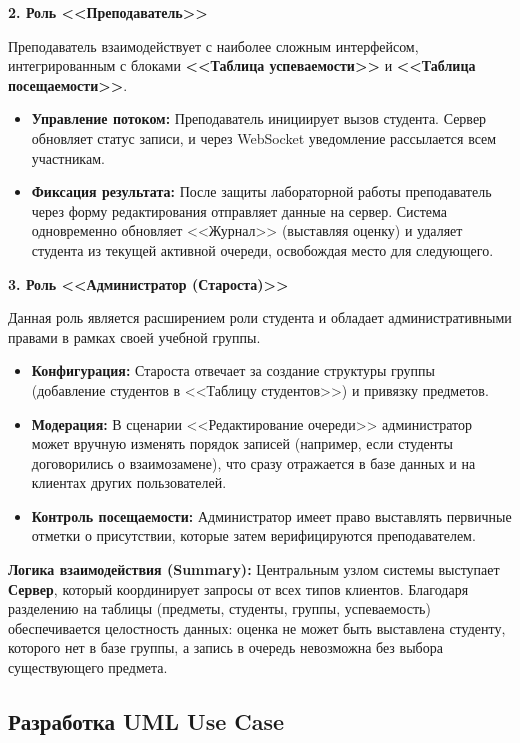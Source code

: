 \textbf{2. Роль <<Преподаватель>>}

Преподаватель взаимодействует с наиболее сложным интерфейсом, интегрированным с блоками 
\textbf{<<Таблица успеваемости>>} и \textbf{<<Таблица посещаемости>>}.

\begin{itemize}
    \item \textbf{Управление потоком:} Преподаватель инициирует вызов студента. Сервер 
	обновляет статус записи, и через WebSocket уведомление рассылается всем участникам.
    \item \textbf{Фиксация результата:} После защиты лабораторной работы преподаватель через форму 
	редактирования отправляет данные на сервер. Система одновременно обновляет <<Журнал>> (выставляя оценку) 
	и удаляет студента из текущей активной очереди, освобождая место для следующего.
\end{itemize}

\textbf{3. Роль <<Администратор (Староста)>>}

Данная роль является расширением роли студента и обладает административными правами в рамках своей учебной группы.

\begin{itemize}
    \item \textbf{Конфигурация:} Староста отвечает за создание структуры группы (добавление студентов в 
	<<Таблицу студентов>>) и привязку предметов.
    \item \textbf{Модерация:} В сценарии <<Редактирование очереди>> администратор может вручную изменять 
	порядок записей (например, если студенты договорились о взаимозамене), что сразу отражается в базе 
	данных и на клиентах других пользователей.
    \item \textbf{Контроль посещаемости:} Администратор имеет право выставлять первичные отметки о присутствии, 
	которые затем верифицируются преподавателем.
\end{itemize}

\textbf{Логика взаимодействия (Summary):}
Центральным узлом системы выступает \textbf{Сервер}, который координирует запросы от всех типов клиентов.
 Благодаря разделению на таблицы (предметы, студенты, группы, успеваемость) обеспечивается целостность данных: 
 оценка не может быть выставлена студенту, которого нет в базе группы, а запись в очередь невозможна без выбора 
 существующего предмета.


 \subsection{Разработка UML Use Case}

